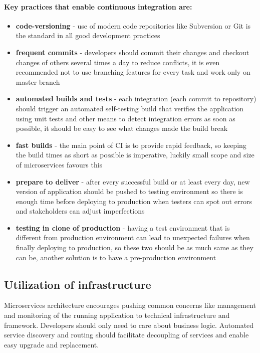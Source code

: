 \documentclass[12pt,oneside]{fithesis2}
\begin{document}
\paragraph {Key practices that enable continuous integration are:}

\begin{itemize}
\item \textbf{code-versioning} - use of modern code repositories like Subversion or Git is the standard in all good development practices
\item \textbf{frequent commits} - developers should commit their changes and checkout changes of others several times a day to reduce conflicts, it is even recommended not to use branching features for every task and work only on master branch
\item \textbf{automated builds and tests} - each integration (each commit to repository) should trigger an automated self-testing build that verifies the application using unit tests and other means to detect integration errors as soon as possible, it should be easy to see what changes made the build break
\item \textbf{fast builds} - the main point of CI is to provide rapid feedback, so keeping the build times as short as possible is imperative, luckily small scope and size of microservices favours this
\item \textbf{prepare to deliver} - after every successful build or at least every day, new version of application should be pushed to testing environment so there is enough time before deploying to production when testers can spot out errors and stakeholders can adjust imperfections
\item \textbf{testing in clone of production} - having a test environment that is different from production environment can lead to unexpected failures when finally deploying to production, so these two should be as much same as they can be, another solution is to have a pre-production environment
\end{itemize}

\subsection{Utilization of infrastructure}

Microservices architecture encourages pushing common concerns like management and monitoring of the running application to technical infrastructure and framework. Developers should only need to care about business logic.
Automated service discovery and routing should facilitate decoupling of services and enable easy upgrade and replacement.
\end{document}
